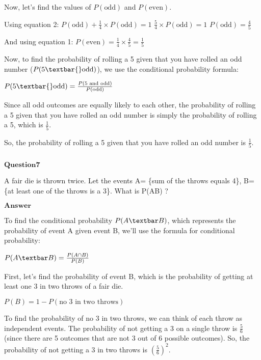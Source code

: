 \documentclass[11pt]{article}
\makeatletter
\newcommand{\boxspacing}{\kern\kvtcb@left@rule\kern\kvtcb@boxsep}
\newcommand{\prompt}[4]{
        {\ttfamily\llap{{\color{#2}[#3]:\hspace{3pt}#4}}\vspace{-\baselineskip}}
    }
\makeatother
\begin{document}
Now, let's find the values of $ P(\text{odd}) $ and $ P(\text{even})
$.

Using equation 2: $ P(\text{odd}) + \frac{1}{4} \times P(\text{odd}) =
1 $ $ \frac{5}{4} \times P(\text{odd}) = 1 $ $ P(\text{odd}) =
\frac{4}{5} $

And using equation 1: $ P(\text{even}) = \frac{1}{4} \times \frac{4}{5}
= \frac{1}{5} $

Now, to find the probability of rolling a 5 given that you have rolled
an odd number ($ P(\text{5}\textbar{}\text{odd}) $), we use the
conditional probability formula:

$ P(\text{5}\textbar{}\text{odd}) =
\frac{P(\text{5 and odd})}{P(\text{odd})} $

Since all odd outcomes are equally likely to each other, the probability
of rolling a 5 given that you have rolled an odd number is simply the
probability of rolling a 5, which is $ \frac{1}{5} $.

So, the probability of rolling a 5 given that you have rolled an odd
number is $ \frac{1}{5} $.

    \begin{tcolorbox}[breakable, size=fbox, boxrule=1pt, pad at break*=1mm,colback=cellbackground, colframe=cellborder]
\prompt{In}{incolor}{ }{\boxspacing}
\begin{Verbatim}[commandchars=\\\{\}]

\end{Verbatim}
\end{tcolorbox}

    $\textbf{Question7}$

A fair die is thrown twice. Let the events A= \{sum of the throws equals
4\}, B=\{at least one of the throws is a 3\}. What is P(A\textbar B) ?

$\textbf{Answer}$

    To find the conditional probability $ P(A\textbar B) $, which
represents the probability of event A given event B, we'll use the
formula for conditional probability:

$ P(A\textbar B) = \frac{P(A \cap B)}{P(B)} $

First, let's find the probability of event B, which is the probability
of getting at least one 3 in two throws of a fair die.

$ P(B) = 1 - P(\text{no 3 in two throws}) $

To find the probability of no 3 in two throws, we can think of each
throw as independent events. The probability of not getting a 3 on a
single throw is $ \frac{5}{6} $ (since there are 5 outcomes that are
not 3 out of 6 possible outcomes). So, the probability of not getting a
3 in two throws is $ \left(\frac{5}{6}\right)^2 $.
\end{document}
